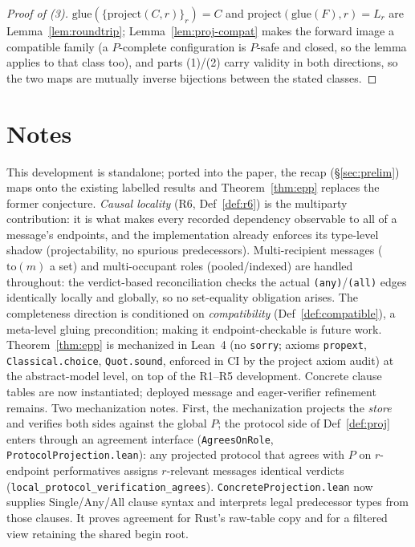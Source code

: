 \documentclass[11pt]{article}
\newcommand{\code}[1]{\texttt{#1}}
\theoremstyle{definition}
\theoremstyle{plain}
\begin{document}
\begin{proof}[Proof of (3)]
$\mathrm{glue}(\{\mathrm{project}(C,r)\}_r)=C$ and
$\mathrm{project}(\mathrm{glue}(F),r)=L_r$ are Lemma~\ref{lem:roundtrip};
Lemma~\ref{lem:proj-compat} makes the forward image a compatible family (a $P$-complete
configuration is $P$-safe and closed, so the lemma applies to that class too), and parts
(1)/(2) carry validity in both directions, so the two maps are mutually inverse bijections
between the stated classes.
\end{proof}

\section{Notes}
\label{sec:notes}
This development is standalone; ported into the paper, the recap (\S\ref{sec:prelim}) maps
onto the existing labelled results and Theorem~\ref{thm:epp} replaces the former conjecture.
\emph{Causal locality} (R6, Def~\ref{def:r6}) is the multiparty contribution: it is what
makes every recorded dependency observable to all of a message's endpoints, and the
implementation already enforces its type-level shadow (projectability, no spurious
predecessors).
Multi-recipient messages ($\mathrm{to}(m)$ a set) and multi-occupant roles (pooled/indexed)
are handled throughout: the verdict-based reconciliation checks the actual
\code{(any)}/\code{(all)} edges identically locally and globally, so no set-equality
obligation arises.
The completeness direction is conditioned on \emph{compatibility} (Def~\ref{def:compatible}),
a meta-level gluing precondition; making it endpoint-checkable is future work.
Theorem~\ref{thm:epp} is mechanized in Lean~4 (no \code{sorry}; axioms \code{propext},
\code{Classical.choice}, \code{Quot.sound}, enforced in CI by the project axiom audit) at
the abstract-model level, on top of the R1--R5 development. Concrete clause tables
are now instantiated; deployed message and eager-verifier refinement remains.
Two mechanization notes.
First, the mechanization projects the \emph{store} and verifies both sides against the
global $P$; the protocol side of Def~\ref{def:proj} enters through an agreement
interface (\code{AgreesOnRole}, \code{ProtocolProjection.lean}): any projected protocol
that agrees with $P$ on $r$-endpoint performatives assigns $r$-relevant messages
identical verdicts (\code{local\_protocol\_verification\_agrees}).
\code{ConcreteProjection.lean} now supplies Single/Any/All clause syntax and
interprets legal predecessor types from those clauses. It proves agreement for
Rust's raw-table copy and for a filtered view retaining the shared begin root.
\end{document}
